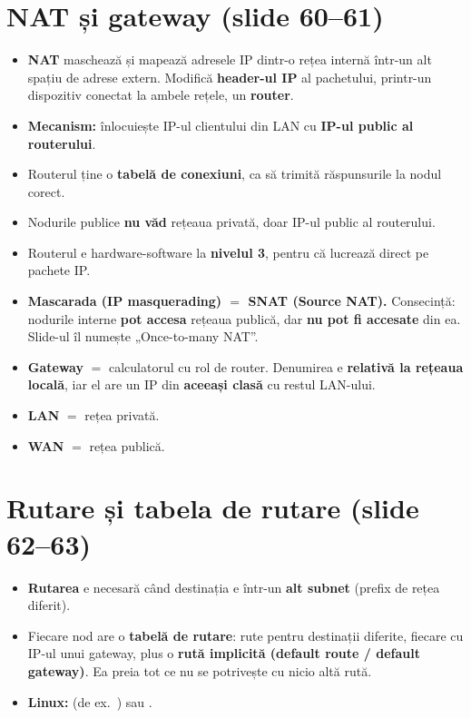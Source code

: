 \documentclass[11pt,a4paper]{article}
\begin{document}

\section{NAT și gateway (slide 60--61)}
\begin{itemize}
  \item \textbf{NAT} maschează și mapează adresele IP dintr-o rețea internă într-un alt spațiu de adrese extern. Modifică \textbf{header-ul IP} al pachetului, printr-un dispozitiv conectat la ambele rețele, un \textbf{router}.
  \item \textbf{Mecanism:} înlocuiește IP-ul clientului din LAN cu \textbf{IP-ul public al routerului}.
  \item Routerul ține o \textbf{tabelă de conexiuni}, ca să trimită răspunsurile la nodul corect.
  \item Nodurile publice \textbf{nu văd} rețeaua privată, doar IP-ul public al routerului.
  \item Routerul e hardware-software la \textbf{nivelul 3}, pentru că lucrează direct pe pachete IP.
  \item \textbf{Mascarada (IP masquerading) $=$ SNAT (Source NAT).} Consecință: nodurile interne \textbf{pot accesa} rețeaua publică, dar \textbf{nu pot fi accesate} din ea. Slide-ul îl numește „Once-to-many NAT”.
  \item \textbf{Gateway} $=$ calculatorul cu rol de router. Denumirea e \textbf{relativă la rețeaua locală}, iar el are un IP din \textbf{aceeași clasă} cu restul LAN-ului.
  \item \textbf{LAN} $=$ rețea privată.
  \item \textbf{WAN} $=$ rețea publică.
\end{itemize}

\section{Rutare și tabela de rutare (slide 62--63)}
\begin{itemize}
  \item \textbf{Rutarea} e necesară când destinația e într-un \textbf{alt subnet} (prefix de rețea diferit).
  \item Fiecare nod are o \textbf{tabelă de rutare}: rute pentru destinații diferite, fiecare cu IP-ul unui gateway, plus o \textbf{rută implicită (default route / default gateway)}. Ea preia tot ce nu se potrivește cu nicio altă rută.
  \item \textbf{Linux:}  (de ex.\ ) sau .
\end{itemize}
\end{document}
